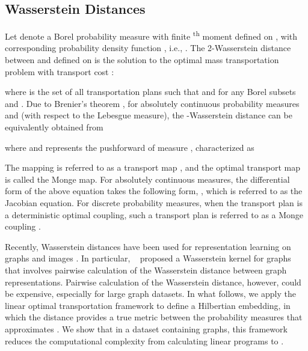 \documentclass[table]{article} \usepackage{iclr2021_conference,times}
\begin{document}
\subsection{Wasserstein Distances}\label{sec:wd}
\vspace{-0.05in}

Let  denote a Borel probability measure with finite \textsuperscript{th} moment defined on , with corresponding probability density function , i.e., . The 2-Wasserstein distance between  and  defined on  is the solution to the optimal mass transportation problem with  transport cost \citep{villani2008optimal}:
\vspace{-.1in}

where  is the set of all transportation plans  such that  and  for any Borel subsets  and .
Due to Brenier's theorem \citep{brenier1991polar}, for absolutely continuous probability measures  and  (with respect to the Lebesgue measure), the -Wasserstein distance can be equivalently obtained from
\vspace{-.05in}

where  and  represents the pushforward of measure , characterized as
\vspace{-.05in}

The mapping  is referred to as a transport map \citep{kolouri2017optimal}, and the optimal transport map is called the Monge map. For absolutely continuous measures, the differential form of the above equation takes the following form, , which is referred to as the Jacobian equation.
For discrete probability measures, when the transport plan  is a deterministic optimal coupling, such a transport plan is referred to as a Monge coupling \citep{villani2008optimal}.

Recently, Wasserstein distances have been used for representation learning on graphs and images \citep{togninalli2019wasserstein,Zhang_2020_CVPR,becigneul2020optimal}.
In particular, ~\citep{togninalli2019wasserstein} proposed a Wasserstein kernel for graphs that involves pairwise calculation of the Wasserstein distance between graph representations. Pairwise calculation of the Wasserstein distance, however, could be expensive, especially for large graph datasets. In what follows, we apply the linear optimal transportation framework \citep{wang2013linear} to define a Hilbertian embedding, in which the  
distance provides a true metric between the probability measures that approximates . We show that in a dataset containing  graphs, this framework reduces the computational complexity from calculating  linear programs to .
\end{document}
